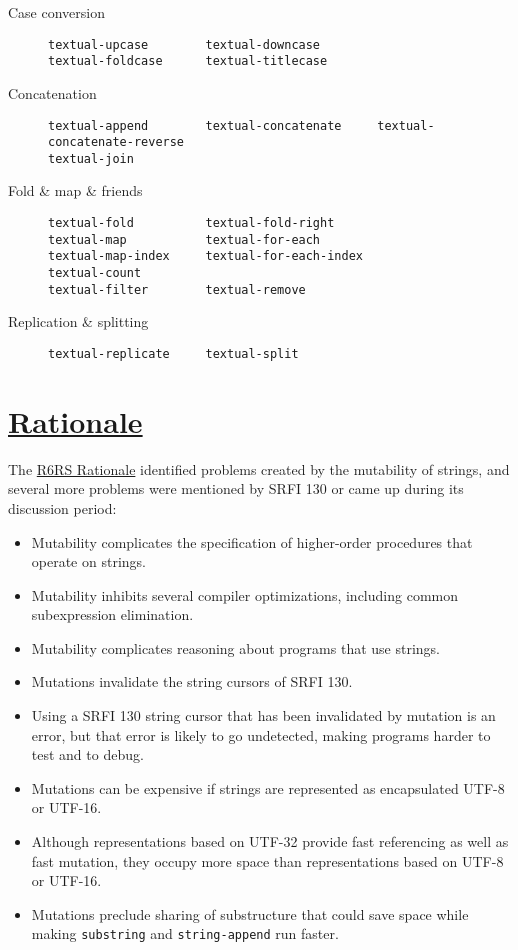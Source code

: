 \begin{description}
\item[ Case conversion]
\begin{verbatim}
textual-upcase        textual-downcase
textual-foldcase      textual-titlecase
\end{verbatim}
\item[ Concatenation]
\begin{verbatim}
textual-append        textual-concatenate     textual-concatenate-reverse
textual-join
\end{verbatim}
\item[Fold \& map \& friends]
\begin{verbatim}
textual-fold          textual-fold-right
textual-map           textual-for-each
textual-map-index     textual-for-each-index
textual-count
textual-filter        textual-remove
\end{verbatim}
\item[Replication \& splitting]
\begin{verbatim}
textual-replicate     textual-split
\end{verbatim}
\end{description}

\section{\texorpdfstring{\href{}{Rationale}}{Rationale}}\label{rationale}

The \protect\hyperlink{R6RS-Rationale}{R6RS Rationale} identified
problems created by the mutability of strings, and several more problems
were mentioned by SRFI 130 or came up during its discussion period:

\begin{itemize}
\tightlist
\item
  Mutability complicates the specification of higher-order procedures
  that operate on strings.
\item
  Mutability inhibits several compiler optimizations, including common
  subexpression elimination.
\item
  Mutability complicates reasoning about programs that use strings.
\item
  Mutations invalidate the string cursors of SRFI 130.
\item
  Using a SRFI 130 string cursor that has been invalidated by mutation
  is an error, but that error is likely to go undetected, making
  programs harder to test and to debug.
\item
  Mutations can be expensive if strings are represented as encapsulated
  UTF-8 or UTF-16.
\item
  Although representations based on UTF-32 provide fast referencing as
  well as fast mutation, they occupy more space than representations
  based on UTF-8 or UTF-16.
\item
  Mutations preclude sharing of substructure that could save space while
  making \texttt{substring} and \texttt{string-append} run faster.
\end{itemize}

